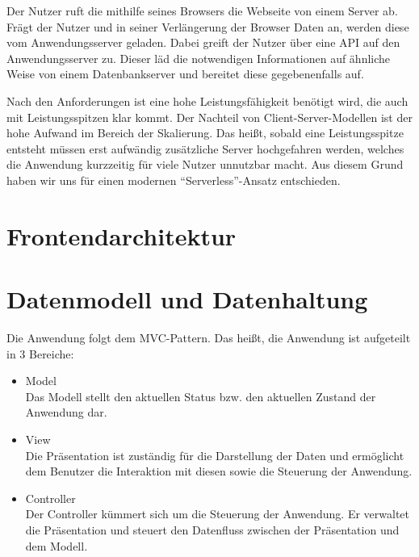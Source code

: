 Der Nutzer ruft die mithilfe seines Browsers die Webseite von einem Server ab.
Frägt der Nutzer und in seiner Verlängerung der Browser Daten an, werden diese vom Anwendungsserver geladen.
Dabei greift der Nutzer über eine \ac{API} auf den Anwendungsserver zu.
Dieser läd die notwendigen Informationen auf ähnliche Weise von einem Datenbankserver und bereitet diese gegebenenfalls auf.

Nach den Anforderungen ist eine hohe Leistungsfähigkeit benötigt wird, die auch mit Leistungsspitzen klar kommt.
Der Nachteil von Client-Server-Modellen ist der hohe Aufwand im Bereich der Skalierung.
Das heißt, sobald eine Leistungsspitze entsteht müssen erst aufwändig zusätzliche Server hochgefahren werden, welches die Anwendung kurzzeitig für viele Nutzer unnutzbar macht.
Aus diesem Grund haben wir uns für einen modernen \enquote{Serverless}-Ansatz entschieden.






\section{Frontendarchitektur}
\section{Datenmodell und Datenhaltung}

Die Anwendung folgt dem \ac{MVC}-Pattern. Das heißt, die Anwendung ist aufgeteilt in 3 Bereiche:
\begin{itemize}%
    \item Model\\
        Das Modell stellt den aktuellen Status bzw. den aktuellen Zustand der Anwendung dar.
    \item View\\
        Die Präsentation ist zuständig für die Darstellung der Daten und ermöglicht dem Benutzer die Interaktion mit diesen sowie die Steuerung der Anwendung.
    \item Controller\\
        Der Controller kümmert sich um die Steuerung der Anwendung. Er verwaltet die Präsentation und steuert den Datenfluss zwischen der Präsentation und dem Modell.
\end{itemize}

